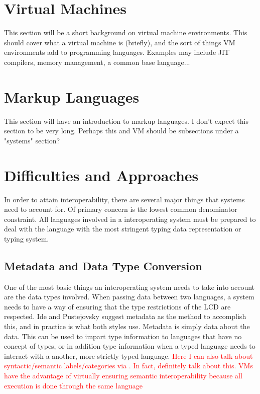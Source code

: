 \documentclass{sig-alternate}
\newcommand{\mycomment}[1]{\textcolor{red}{#1}}
\begin{document}
\section{Virtual Machines}\label{VM}
This section will be a short background on virtual machine environments. This should cover what a virtual machine is (briefly), and the sort of things VM environments add to programming languages. Examples may include JIT compilers, memory management, a common base language...

\section{Markup Languages}\label{ML}
This section will have an introduction to markup languages. I don't expect this section to be very long. Perhaps this and VM should be subsections under a "systems" section?

\section{Difficulties and Approaches}\label{approaches}
In order to attain interoperability, there are several major things that systems need to account for. Of primary concern is the lowest common denominator constraint. All languages involved in a interoperating system must be prepared to deal with the language with the most stringent typing data representation or typing system. 

\subsection{Metadata and Data Type Conversion}\label{metadata} \cite{Ide:2010, Bromberg:2011, Hamilton:2003}
One of the most basic things an interoperating system needs to take into account are the data types involved. 
When passing data between two languages, a system needs to have a way of ensuring that the type restrictions of the LCD are respected. Ide and Pustejovsky \cite{Ide:2010} suggest metadata as the method to accomplish this, and in practice is what both styles use. Metadata is simply data about the data. This can be used to impart type information to languages that have no concept of types, or in addition type information when a typed language needs to interact with a another, more strictly typed language.
\mycomment{Here I can also talk about syntactic/semantic labels/categories via \cite{Ide:2010}. In fact, definitely talk about this. VMs have the advantage of virtually ensuring semantic interoperability because all execution is done through the same language}
\end{document}
